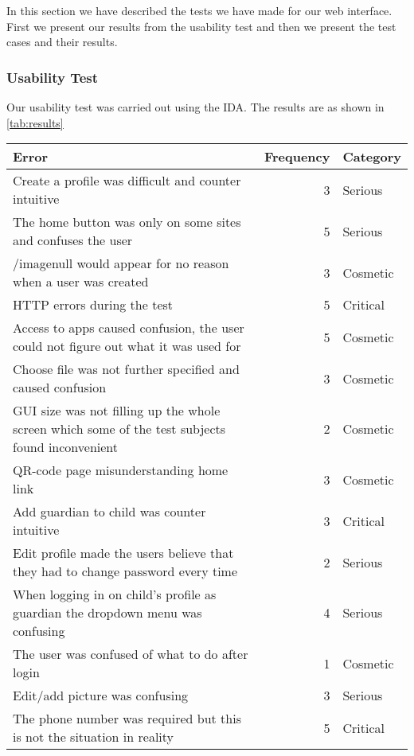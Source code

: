 In this section we have described the tests we have made for our web interface. First we present our results from the usability test and then we present the test cases and their results.

\subsubsection{Usability Test}

Our usability test was carried out using the IDA. The results are as shown in \autoref{tab:results}

\begin{table}[H]
	\scriptsize
	\centering
	\begin{tabular}{|p{7cm}|r|l|}
		\hline
		Error & Frequency & Category \\
		\hline
		\hline
		Create a profile was difficult and counter intuitive & 3 & Serious \\ \hline
		The home button was only on some sites and confuses the user & 5 & Serious \\ \hline
		/imagenull would appear for no reason when a user was created & 3 & Cosmetic \\ \hline
		HTTP errors during the test & 5 & Critical \\ \hline
		Access to apps caused confusion, the user could not figure out what it was used for & 5 & Cosmetic \\ \hline
		Choose file was not further specified and caused confusion & 3 & Cosmetic \\ \hline
		GUI size was not filling up the whole screen which some of the test subjects found inconvenient & 2 & Cosmetic \\ \hline
		QR-code page misunderstanding home link & 3 & Cosmetic \\ \hline
		Add guardian to child was counter intuitive & 3 & Critical \\ \hline
		Edit profile made the users believe that they had to change password every time & 2 & Serious \\ \hline
		When logging in on child's profile as guardian the dropdown menu was confusing & 4 & Serious \\ \hline
		The user was confused of what to do after login & 1 & Cosmetic \\ \hline
		Edit/add picture was confusing & 3 & Serious \\ \hline
		The phone number was required but this is not the situation in reality & 5 & Critical \\ \hline

\end{tabular}
\end{table}
